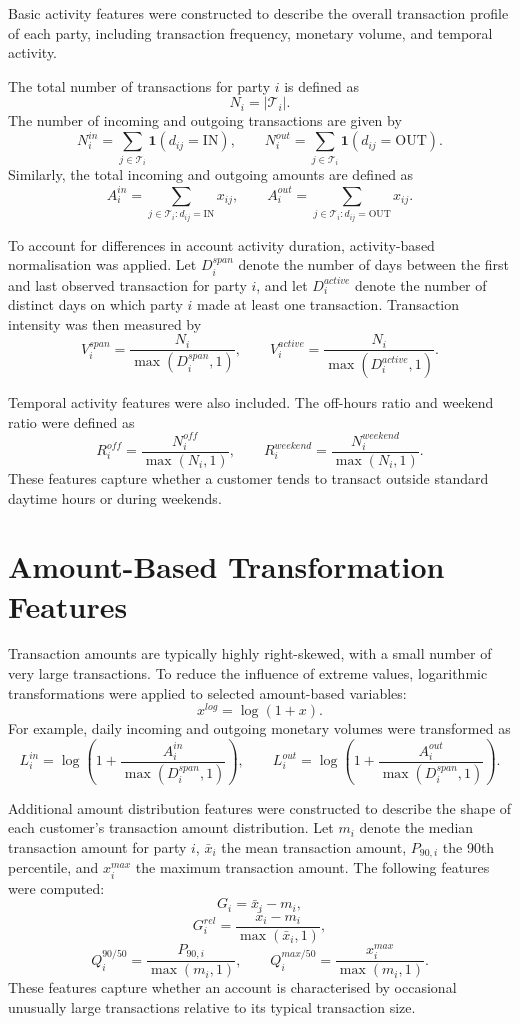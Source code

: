 Basic activity features were constructed to describe the overall transaction profile of each party, including transaction frequency, monetary volume, and temporal activity.

The total number of transactions for party \(i\) is defined as
\[
N_i = |\mathcal{T}_i|.
\]
The number of incoming and outgoing transactions are given by
\[
N_i^{in} = \sum_{j \in \mathcal{T}_i} \mathbf{1}(d_{ij}=\mathrm{IN}),
\qquad
N_i^{out} = \sum_{j \in \mathcal{T}_i} \mathbf{1}(d_{ij}=\mathrm{OUT}).
\]
Similarly, the total incoming and outgoing amounts are defined as
\[
A_i^{in} = \sum_{j \in \mathcal{T}_i: d_{ij}=\mathrm{IN}} x_{ij},
\qquad
A_i^{out} = \sum_{j \in \mathcal{T}_i: d_{ij}=\mathrm{OUT}} x_{ij}.
\]

To account for differences in account activity duration, activity-based normalisation was applied. Let \(D_i^{span}\) denote the number of days between the first and last observed transaction for party \(i\), and let \(D_i^{active}\) denote the number of distinct days on which party \(i\) made at least one transaction. Transaction intensity was then measured by
\[
V_i^{span} = \frac{N_i}{\max(D_i^{span},1)},
\qquad
V_i^{active} = \frac{N_i}{\max(D_i^{active},1)}.
\]

Temporal activity features were also included. The off-hours ratio and weekend ratio were defined as
\[
R_i^{off} =
\frac{N_i^{off}}{\max(N_i,1)},
\qquad
R_i^{weekend} =
\frac{N_i^{weekend}}{\max(N_i,1)}.
\]
These features capture whether a customer tends to transact outside standard daytime hours or during weekends.

\section{Amount-Based Transformation Features}

Transaction amounts are typically highly right-skewed, with a small number of very large transactions. To reduce the influence of extreme values, logarithmic transformations were applied to selected amount-based variables:
\[
x^{log} = \log(1+x).
\]
For example, daily incoming and outgoing monetary volumes were transformed as
\[
L_i^{in} =
\log\left(1 + \frac{A_i^{in}}{\max(D_i^{span},1)}\right),
\qquad
L_i^{out} =
\log\left(1 + \frac{A_i^{out}}{\max(D_i^{span},1)}\right).
\]

Additional amount distribution features were constructed to describe the shape of each customer's transaction amount distribution. Let \(m_i\) denote the median transaction amount for party \(i\), \(\bar{x}_i\) the mean transaction amount, \(P_{90,i}\) the 90th percentile, and \(x_{i}^{max}\) the maximum transaction amount. The following features were computed:
\[
G_i = \bar{x}_i - m_i,
\]
\[
G_i^{rel} =
\frac{\bar{x}_i - m_i}{\max(\bar{x}_i,1)},
\]
\[
Q_i^{90/50} =
\frac{P_{90,i}}{\max(m_i,1)},
\qquad
Q_i^{max/50} =
\frac{x_i^{max}}{\max(m_i,1)}.
\]
These features capture whether an account is characterised by occasional unusually large transactions relative to its typical transaction size.

